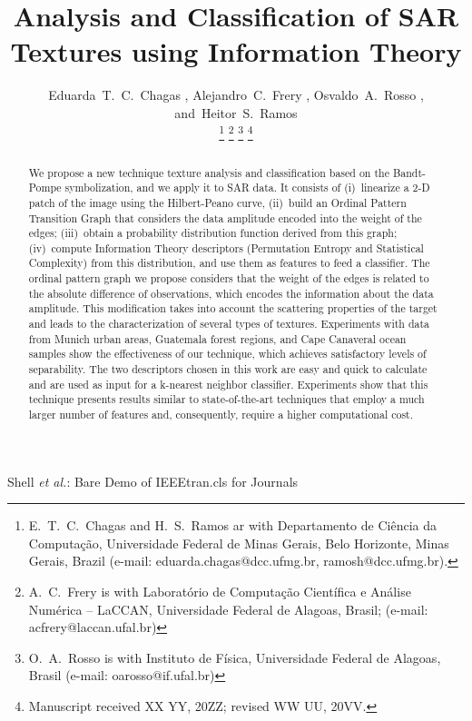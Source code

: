 \documentclass[journal]{IEEEtran}
\newcommand\orcidicon[1]{\href{https://orcid.org/#1}{\mbox{\scalerel*{
				\begin{tikzpicture}[yscale=-1,transform shape]
				\pic{orcidlogo};
				\end{tikzpicture}
			}{|}}}}
\begin{document}
	
	\title{Analysis and Classification of SAR Textures using Information Theory}
	
	\author{Eduarda~T.~C.~Chagas \orcidicon{0000-0001-9647-0506},
		Alejandro~C.~Frery \orcidicon{0000-0002-8002-5341},
		Osvaldo~A.~Rosso \orcidicon{0000-0002-1288-2528},
		and~Heitor~S.~Ramos \orcidicon{0000-0003-4523-6466}
		
		\thanks{E.\ T.\ C.\ Chagas and H.\ S.\ Ramos ar with Departamento de Ci\^encia da Computa\c c\~ao, Universidade Federal de Minas Gerais, Belo Horizonte, Minas Gerais, Brazil (e-mail: eduarda.chagas@dcc.ufmg.br, ramosh@dcc.ufmg.br).}
		\thanks{A.\ C.\ Frery is with Laborat\'orio de Computa\c c\~ao Cient\'ifica e An\'alise Num\'erica -- LaCCAN, Universidade Federal de Alagoas, Brasil; (e-mail: acfrery@laccan.ufal.br)}
		\thanks{O.\ A.\ Rosso is with Instituto de F\'isica, Universidade Federal de Alagoas, Brasil (e-mail: oarosso@if.ufal.br)}
		\thanks{Manuscript received XX YY, 20ZZ; revised WW UU, 20VV.}}
	
	
	{Shell \MakeLowercase{\textit{et al.}}: Bare Demo of IEEEtran.cls for Journals}
	
	\maketitle
	
	\begin{abstract}
		We propose a new technique texture analysis and classification based on the Bandt-Pompe symbolization, and we apply it to SAR data.
		It consists of
		(i)~linearize a 2-D patch of the image using the Hilbert-Peano curve,
		(ii)~build an Ordinal Pattern Transition Graph that considers the data amplitude encoded into the weight of the edges;
		(iii)~obtain a probability distribution function derived from this graph;
		(iv)~compute Information Theory descriptors (Permutation Entropy and Statistical Complexity) from this distribution, and use them as features to feed a classifier.
		The ordinal pattern graph we propose considers that the weight of the edges is related to the absolute difference of observations, which encodes the information about the data amplitude. 
		This modification takes into account the scattering properties of the target and leads to the characterization of several types of textures.
		Experiments with data from Munich urban areas, Guatemala forest regions, and Cape Canaveral ocean samples show the effectiveness of our technique, which achieves satisfactory levels of separability.
		The two descriptors chosen in this work are easy and quick to calculate and are used as input for a k-nearest neighbor classifier.
		Experiments show that this technique presents results similar to state-of-the-art techniques that employ a much larger number of features and, consequently, require a higher computational cost.
	\end{abstract}
	
\end{document}
